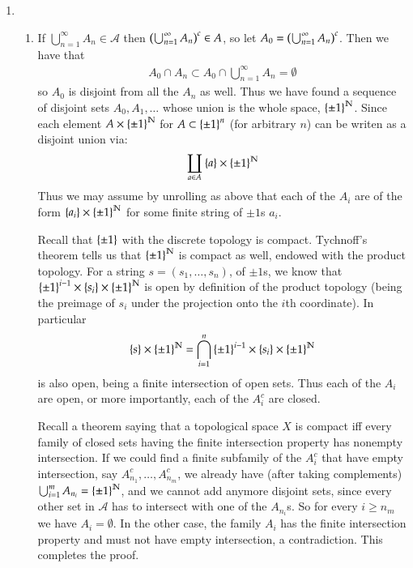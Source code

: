 \documentclass[12pt]{article}
\theoremstyle{definitionstyle}
\newcommand{\SET}[1]{\Set{\mskip-\medmuskip #1 \mskip-\medmuskip}}
\newcommand{\1}{\mathds 1}
\newcommand{\N}{\mathbb N}
\begin{document}
\begin{enumerate}
        \item 
        \begin{enumerate}[label=\alph*)]
            \item If $\bigcup_{n=1}^\infty A_n \in \mathscr{A}$ then $\qty(\bigcup_{n=1}^\infty A_n)^c \in A$, so let $A_0 = \qty(\bigcup_{n=1}^\infty A_n)^c$. Then we have that \begin{align*}
                A_0 \cap A_n \subset A_0 \cap \bigcup_{n=1}^\infty A_n = \emptyset
            \end{align*} so $A_0$ is disjoint from all the $A_n$ as well. Thus we have found a sequence of disjoint sets $A_0, A_1, \ldots$ whose union is the whole space, $\SET{\pm 1}^\N$. Since each element $A \times \SET{\pm 1}^\N$ for $A \subset \SET{\pm 1}^n$ (for arbitrary $n$) can be writen as a disjoint union via:
            \begin{align*}
                \coprod_{a \in A} \SET{a} \times \SET{\pm 1}^\N
            \end{align*}
            Thus we may assume by unrolling as above that each of the $A_i$ are of the form $\SET{a_i} \times \SET{\pm 1}^\N$ for some finite string of $\pm 1$s $a_i$. 
    
            Recall that $\SET{\pm 1}$ with the discrete topology is compact. Tychnoff's theorem tells us that $\SET{\pm 1}^\N$ is compact as well, endowed with the product topology. For a string $s = (s_1, \ldots, s_n)$, of $\pm 1$s, we know that $\SET{\pm 1}^{i-1} \times \SET{s_i} \times \SET{\pm 1}^\N$ is open by definition of the product topology (being the preimage of $s_i$ under the projection onto the $i$th coordinate). In particular 
            \begin{align*}
                \SET{s} \times \SET{\pm 1}^\N = \bigcap_{i=1}^n \SET{\pm 1}^{i-1} \times \SET{s_i} \times \SET{\pm 1}^\N
            \end{align*}
            is also open, being a finite intersection of open sets. Thus each of the $A_i$ are open, or more importantly, each of the $A_i^c$ are closed. 
            
            Recall a theorem saying that a topological space $X$ is compact iff every family of closed sets having the finite intersection property has nonempty intersection. If we could find a finite subfamily of the $A_i^c$ that have empty intersection, say $A_{n_1}^c, \ldots, A_{n_m}^c$, we already have (after taking complements) $\bigcup_{i=1}^m A_{n_i} = \SET{\pm 1}^\N$, and we cannot add anymore disjoint sets, since every other set in $\mathscr{A}$ has to intersect with one of the $A_{n_i}$s. So for every $i \geq n_m$ we have $A_i = \emptyset$. In the other case, the family $A_i$ has the finite intersection property and must not have empty intersection, a contradiction. This completes the proof.


\end{enumerate}
\end{enumerate}
\end{document}
